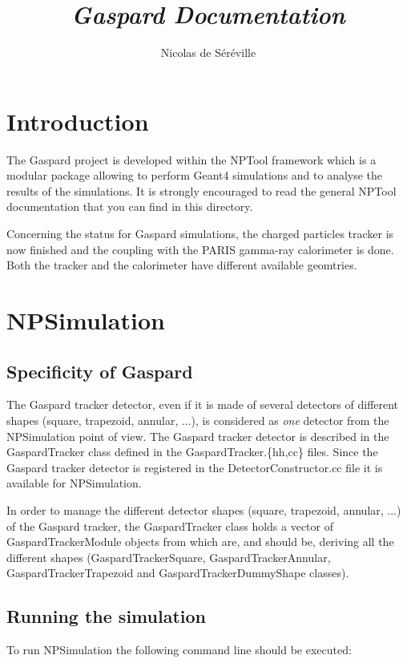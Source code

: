 \documentclass[a4paper,12pt]{article}
\begin{document}
\title{\emph{Gaspard Documentation}}
\author{Nicolas de S\'er\'eville}

\maketitle 
\pagebreak
\tableofcontents
\pagebreak


\section{Introduction}
The Gaspard project is developed within the NPTool framework which is a 
modular package allowing to perform Geant4 simulations and to analyse the 
results of the simulations. It is strongly encouraged to read the general 
NPTool documentation that you can find in this directory.

Concerning the status for Gaspard simulations, the charged particles tracker
is now finished and the coupling with the PARIS gamma-ray calorimeter is
done. Both the tracker and the calorimeter have different available geomtries.


\section{NPSimulation}
\subsection{Specificity of Gaspard}
The Gaspard tracker detector, even if it is made of several detectors of
different shapes (square, trapezoid, annular, ...), is considered as {\it one} 
detector from the NPSimulation point of view. The Gaspard tracker detector 
is described in the GaspardTracker class defined in the GaspardTracker.\{hh,cc\} 
files. Since the Gaspard tracker detector is registered in the 
DetectorConstructor.cc file it is available for NPSimulation.

In order to manage the different detector shapes (square, trapezoid, annular, 
...) of the Gaspard tracker, the GaspardTracker class holds a vector of 
GaspardTrackerModule objects from which are, and should be, deriving all 
the different shapes (GaspardTrackerSquare, GaspardTrackerAnnular,
GaspardTrackerTrapezoid and GaspardTrackerDummyShape classes).


\subsection{Running the simulation}
To run NPSimulation the following command line should be executed: 
\end{document}
